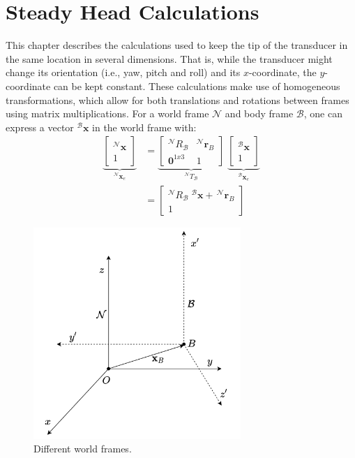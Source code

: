 \chapter{Steady Head Calculations}
\label{chap:SHC}
This chapter describes the calculations used to keep the tip of the transducer in the same location in several dimensions. That is, while the transducer might change its orientation (i.e., yaw, pitch and roll) and its $x$-coordinate, the $y$-coordinate can be kept constant. These calculations make use of homogeneous transformations, which allow for both translations and rotations between frames using matrix multiplications. For a world frame $\mathcal{N}$ and body frame $\mathcal{B}$, one can express a vector $^\mathcal{B}\mathbf{x}$ in the world frame with:
\begin{align}
    \underbrace{\left[\begin{array}{r} ^\mathcal{N}\mathbf{x}  \\ 1 \end{array}\right]}_{^\mathcal{N}\mathbf{x}_e}  &= \underbrace{\left[ \begin{array}{cc} ^\mathcal{N}R_\mathcal{B} &  ^\mathcal{N}\mathbf{r}_{B} \\ \mathbf{0}^{1x3} & 1 \end{array}  \right]}_{^\mathcal{N}T_\mathcal{B}} \; \underbrace{\left[\begin{array}{r} ^\mathcal{B}\mathbf{x}  \\ 1 \end{array}\right]}_{^\mathcal{B}\mathbf{x}_e} \label{eq: homTrans}\\
    &= \left[ \begin{array}{c}
         ^\mathcal{N}R_\mathcal{B}\; ^\mathcal{B}\mathbf{x} +\,  ^\mathcal{N}\mathbf{r}_{B} \\
         1
    \end{array} \right] \nonumber
\end{align}

\begin{figure}
    \centering
    \includegraphics[width=0.7\textwidth]{figures/SteadyHeadCalculations/SHC_transf.png}
    \caption{Different world frames.}
    \label{fig:my_label}
\end{figure}

% 
% 
